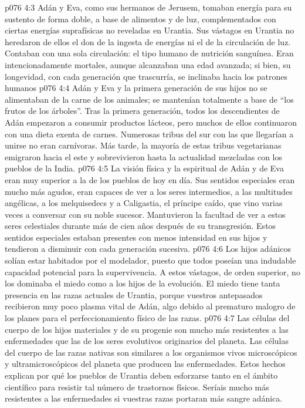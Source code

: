 \vs p076 4:3 Adán y Eva, como sus hermanos de Jerusem, tomaban energía para su sustento de forma doble, a base de alimentos y de luz, complementados con ciertas energías suprafísicas no reveladas en Urantia. Sus vástagos en Urantia no heredaron de ellos el don de la ingesta de energías ni el de la circulación de luz. Contaban con una sola circulación: el tipo humano de nutrición sanguínea. Eran intencionadamente mortales, aunque alcanzaban una edad avanzada; si bien, su longevidad, con cada generación que trascurría, se inclinaba hacia los patrones humanos
\vs p076 4:4 Adán y Eva y la primera generación de sus hijos no se alimentaban de la carne de los animales; se mantenían totalmente a base de “los frutos de los árboles”. Tras la primera generación, todos los descendientes de Adán empezaron a consumir productos lácteos, pero muchos de ellos continuaron con una dieta exenta de carnes. Numerosas tribus del sur con las que llegarían a unirse no eran carnívoras. Más tarde, la mayoría de estas tribus vegetarianas emigraron hacia el este y sobrevivieron hasta la actualidad mezcladas con los pueblos de la India.
\vs p076 4:5 La visión física y la espiritual de Adán y de Eva eran muy superior a la de los pueblos de hoy en día. Sus sentidos especiales eran mucho más agudos, eran capaces de ver a los seres intermedios, a las multitudes angélicas, a los melquisedecs y a Caligastia, el príncipe caído, que vino varias veces a conversar con su noble sucesor. Mantuvieron la facultad de ver a estos seres celestiales durante más de cien años después de su transgresión. Estos sentidos especiales estaban presentes con menos intensidad en sus hijos y tendieron a disminuir con cada generación sucesiva.
\vs p076 4:6 Los hijos adánicos solían estar habitados por el modelador, puesto que todos poseían una indudable capacidad potencial para la supervivencia. A estos vástagos, de orden superior, no los dominaba el miedo como a los hijos de la evolución. El miedo tiene tanta presencia en las razas actuales de Urantia, porque vuestros antepasados recibieron muy poco plasma vital de Adán, algo debido al prematuro malogro de los planes para el perfeccionamiento físico de las razas.
\vs p076 4:7 Las células del cuerpo de los hijos materiales y de su progenie son mucho más resistentes a las enfermedades que las de los seres evolutivos originarios del planeta. Las células del cuerpo de las razas nativas son similares a los organismos vivos microscópicos y ultramicroscópicos del planeta que producen las enfermedades. Estos hechos explican por qué los pueblos de Urantia deben esforzarse tanto en el ámbito científico para resistir tal número de trastornos físicos. Seríais mucho más resistentes a las enfermedades si vuestras razas portaran más sangre adánica.
